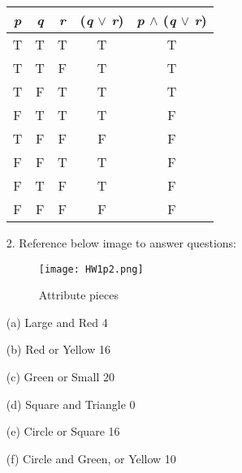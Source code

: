 \documentclass{article}
\begin{document}
\begin{itemize}
    \begin{center}
        \begin{tabular}{|c|c|c|c|c|}
            \hline
            \emph{p} & \emph{q} & \emph{r} & (\emph{q} $\vee$ \emph{r}) & \emph{p} $\wedge$ (\emph{q} $\vee$ \emph{r})\\
            \hline
            T & T & T & T & T\\
            \hline
            T & T & F & T & T\\
            \hline
            T & F & T & T & T\\
            \hline
            F & T & T & T & F\\
            \hline
            T & F & F & F & F\\
            \hline
            F & F & T & T & F\\
            \hline
            F & T & F & T & F\\
            \hline
            F & F & F & F & F\\
            \hline
        \end{tabular}
    \end{center}
    
    \item[2.] Reference below image to answer questions: 
    \begin{figure}[h]
        \centering
        \texttt{[image: HW1p2.png]}
        \caption{Attribute pieces}
        \label{fig:1}
    \end{figure}
    
    (a) Large and Red {\color{blue} 4}
    
    (b) Red or Yellow {\color{blue} 16}
    
    (c) Green or Small {\color{blue} 20}
    
    (d) Square and Triangle {\color{blue} 0}
    
    (e) Circle or Square {\color{blue} 16}
    
    (f) Circle and Green, or Yellow {\color{blue} 10}
    
\end{itemize}
\end{document}
